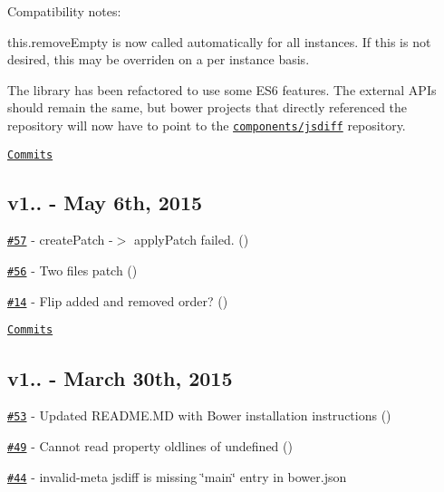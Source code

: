 Compatibility notes\+:
\begin{DoxyItemize}
\item {\ttfamily this.\+remove\+Empty} is now called automatically for all instances. If this is not desired, this may be overriden on a per instance basis.
\item The library has been refactored to use some E\+S6 features. The external A\+P\+Is should remain the same, but bower projects that directly referenced the repository will now have to point to the \href{https://github.com/components/jsdiff}{\tt components/jsdiff} repository.
\end{DoxyItemize}

\href{https://github.com/kpdecker/jsdiff/compare/v1.4.0...v2.0.0}{\tt Commits}

\subsection*{v1.. -\/ May 6th, 2015}


\begin{DoxyItemize}
\item \href{https://github.com/kpdecker/jsdiff/issues/57}{\tt \#57} -\/ create\+Patch -\/$>$ apply\+Patch failed. (\href{https://api.github.com/users/mog422}{\tt })
\item \href{https://github.com/kpdecker/jsdiff/pull/56}{\tt \#56} -\/ Two files patch (\href{https://api.github.com/users/rgeissert}{\tt })
\item \href{https://github.com/kpdecker/jsdiff/issues/14}{\tt \#14} -\/ Flip added and removed order? (\href{https://api.github.com/users/jakesandlund}{\tt })
\end{DoxyItemize}

\href{https://github.com/kpdecker/jsdiff/compare/v1.3.2...v1.4.0}{\tt Commits}

\subsection*{v1.. -\/ March 30th, 2015}


\begin{DoxyItemize}
\item \href{https://github.com/kpdecker/jsdiff/pull/53}{\tt \#53} -\/ Updated R\+E\+A\+D\+M\+E.\+MD with Bower installation instructions (\href{https://api.github.com/users/ofbriggs}{\tt })
\item \href{https://github.com/kpdecker/jsdiff/issues/49}{\tt \#49} -\/ Cannot read property \textquotesingle{}oldlines\textquotesingle{} of undefined (\href{https://api.github.com/users/nwtn}{\tt })
\item \href{https://github.com/kpdecker/jsdiff/issues/44}{\tt \#44} -\/ invalid-\/meta jsdiff is missing \char`\"{}main\char`\"{} entry in bower.\+json
\end{DoxyItemize}

